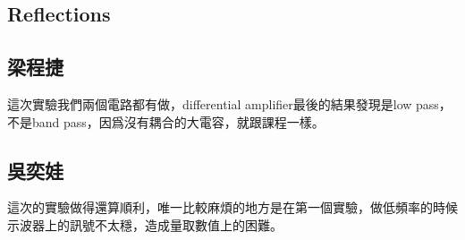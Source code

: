 \documentclass{article}
\begin{document}
\begin{CJK*}{UTF8}{bkai}
\section*{Reflections}
\subsection*{梁程捷}
這次實驗我們兩個電路都有做，differential amplifier最後的結果發現是low pass，不是band pass，因爲沒有耦合的大電容，就跟課程一樣。
\subsection*{吳奕娃}
這次的實驗做得還算順利，唯一比較麻煩的地方是在第一個實驗，做低頻率的時候示波器上的訊號不太穩，造成量取數值上的困難。
\end{CJK*}
\end{document}

